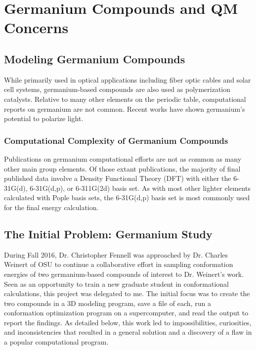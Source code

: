 \chapter{Germanium Compounds and QM Concerns}
\label{ch:Germanium}

\section{Modeling Germanium Compounds}

While primarily used in optical applications including fiber optic cables and solar cell systems, germanium-based compounds are also used as polymerization catalysts.
Relative to many other elements on the periodic table, computational reports on germanium are not common.
Recent works have shown germanium's potential to polarize light.


\subsection{Computational Complexity of Germanium Compounds}

Publications on germanium computational efforts are not as common as many other main group elements. 
Of those extant publications, the majority of final published data involve a Density Functional Theory (DFT) with either the 6-31G(d), 6-31G(d,p), or 6-311G(2d) basis set.\cite{GeCompStudy1}
As with most other lighter elements calculated with Pople basis sets, the 6-31G(d,p) basis set is most commonly used for the final energy calculation.\cite{Weinert1,Weinert2}

\section{The Initial Problem: Germanium Study}

During Fall 2016, Dr. Christopher Fennell was approached by Dr. Charles Weinert of OSU to continue a collaborative effort in sampling conformation energies of two germanium-based compounds of interest to Dr. Weinert's work. 
Seen as an opportunity to train a new graduate student in conformational calculations, this project was delegated to me.
The initial focus was to create the two compounds in a 3D modeling program, save a file of each, run a conformation optimization program on a supercomputer, and read the output to report the findings.
As detailed below, this work led to impossibilities, curiosities, and inconsistencies that resulted in a general solution and a discovery of a flaw in a popular computational program.

